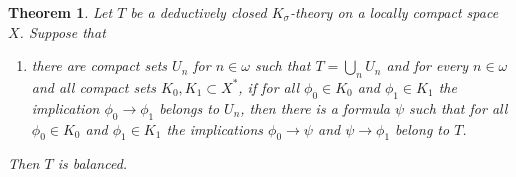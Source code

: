 \documentclass{article}
\newcommand{\gw}{\omega}
\newcommand{\gs}{\sigma}
\newtheorem{theorem}{Theorem}[section]
\theoremstyle{definition}
\begin{document}
\begin{theorem}
\label{ksigmacriterion}
Let $T$ be a deductively closed $K_\gs$-theory on a locally compact space $X$. Suppose that

\begin{enumerate}
\item[(*)] there are compact sets $U_n$ for $n\in\gw$ such that  $T=\bigcup_nU_n$ and for every $n\in\gw$ and all compact sets $K_0, K_1\subset X^*$, if for all $\phi_0\in K_0$ and $\phi_1\in K_1$ the implication $\phi_0\to\phi_1$ belongs to $U_n$, then there is a formula $\psi$ such that for all $\phi_0\in K_0$ and $\phi_1\in K_1$ the implications $\phi_0\to\psi$ and $\psi\to\phi_1$ belong to $T$.
\end{enumerate}

\noindent Then $T$ is balanced.
\end{theorem}
	
\end{document}
